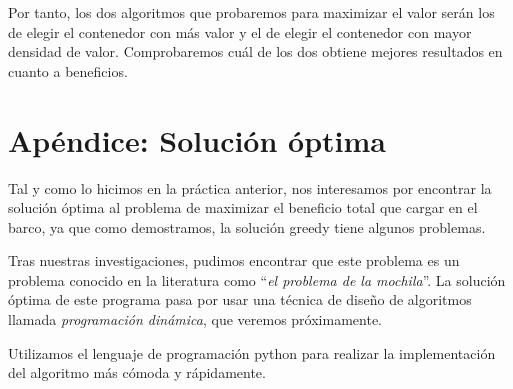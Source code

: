 \documentclass[a4paper, 11pt]{article}
\begin{document}
Por tanto, los dos algoritmos que probaremos para maximizar el valor serán los de elegir el contenedor con más valor y el de elegir el contenedor con mayor densidad de valor. Comprobaremos cuál de los dos obtiene mejores resultados en cuanto a beneficios.

\section{Apéndice: Solución óptima}
Tal y como lo hicimos en la práctica anterior, nos interesamos por encontrar la solución óptima al problema de maximizar el beneficio total que cargar en el barco, ya que como demostramos, la solución greedy tiene algunos problemas.

Tras nuestras investigaciones, pudimos encontrar que este problema es un problema conocido en la literatura como ``\textit{el problema de la mochila}''. La solución óptima de este programa pasa por usar una técnica de diseño de algoritmos llamada \textit{programación dinámica}, que veremos próximamente.

Utilizamos el lenguaje de programación python para realizar la implementación del algoritmo más cómoda y rápidamente.	
\end{document}

